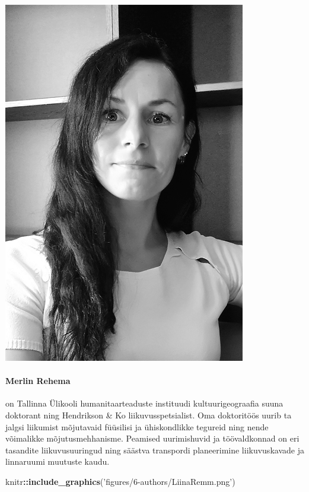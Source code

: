 \documentclass[estonian,]{article}
\newenvironment{Shaded}{\begin{snugshade}}{\end{snugshade}}
\newcommand{\KeywordTok}[1]{\textcolor[rgb]{0.13,0.29,0.53}{\textbf{#1}}}
\newcommand{\NormalTok}[1]{#1}
\newcommand{\OperatorTok}[1]{\textcolor[rgb]{0.81,0.36,0.00}{\textbf{#1}}}
\newcommand{\StringTok}[1]{\textcolor[rgb]{0.31,0.60,0.02}{#1}}
\let\oldparagraph\paragraph
\renewcommand{\paragraph}[1]{\oldparagraph{#1}\mbox{}}
\begin{document}
\begin{flushleft}\includegraphics[width=0.5\linewidth]{figures/6-authors/MerlinRehema} \end{flushleft}

\hypertarget{merlin-rehema}{%
\paragraph{Merlin Rehema}\label{merlin-rehema}}

on Tallinna Ülikooli humanitaarteaduste instituudi kultuurigeograafia suuna doktorant ning Hendrikson \& Ko liikuvusspetsialist. Oma doktoritöös uurib ta jalgsi liikumist mõjutavaid füüsilisi ja ühiskondlikke tegureid ning nende võimalikke mõjutusmehhanisme. Peamised uurimishuvid ja töövaldkonnad on eri tasandite liikuvusuuringud ning säästva transpordi planeerimine liikuvuskavade ja linnaruumi muutuste kaudu.

\begin{Shaded}
\begin{Highlighting}[]
\NormalTok{knitr}\OperatorTok{::}\KeywordTok{include_graphics}\NormalTok{(}\StringTok{'figures/6-authors/LiinaRemm.png'}\NormalTok{)}
\end{Highlighting}
\end{Shaded}
\end{document}
